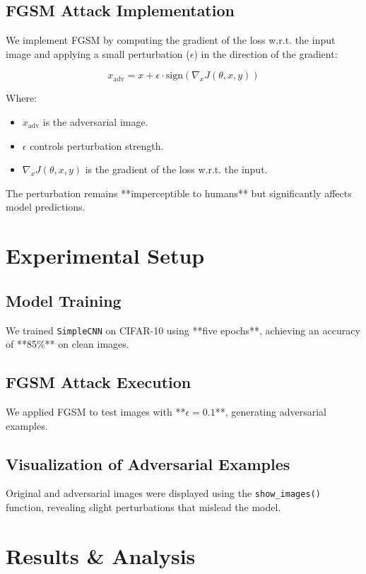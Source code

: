 \documentclass{article}
\begin{document}
\subsection{FGSM Attack Implementation}
We implement FGSM by computing the gradient of the loss w.r.t. the input image and applying a small perturbation (\(\epsilon\)) in the direction of the gradient:

\begin{equation}
    x_{\text{adv}} = x + \epsilon \cdot \text{sign}(\nabla_x J(\theta, x, y))
\end{equation}

Where:
\begin{itemize}
    \item \( x_{\text{adv}} \) is the adversarial image.
    \item \( \epsilon \) controls perturbation strength.
    \item \( \nabla_x J(\theta, x, y) \) is the gradient of the loss w.r.t. the input.
\end{itemize}

The perturbation remains **imperceptible to humans** but significantly affects model predictions.

\section{Experimental Setup}

\subsection{Model Training}
We trained \texttt{SimpleCNN} on CIFAR-10 using **five epochs**, achieving an accuracy of **85\%** on clean images.

\subsection{FGSM Attack Execution}
We applied FGSM to test images with **\(\epsilon = 0.1\)**, generating adversarial examples.

\subsection{Visualization of Adversarial Examples}
Original and adversarial images were displayed using the \texttt{show\_images()} function, revealing slight perturbations that mislead the model.

\section{Results \& Analysis}
\end{document}
